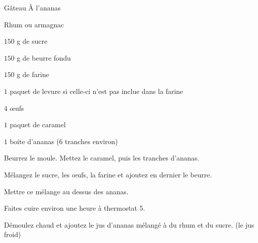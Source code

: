 \begin{recette}{Gâteau À l'ananas}
\begin{ingredients}
\item Rhum ou armagnac
\item $150$ g de sucre
\item $150$ g de beurre fondu
\item $150$ g de farine
\item $1$ paquet de levure si celle-ci n'est pas inclue dans la farine
\item $4$ œufs
\item $1$ paquet de caramel
\item $1$ boite d'ananas ($6$ tranches environ)
\end{ingredients}

\begin{preparation}
\item Beurrez le moule. Mettez le caramel, puis les tranches d'ananas.
\item Mélangez le sucre, les œufs, la farine et ajoutez en dernier le beurre.
\item Mettre ce mélange au dessus des ananas.
\end{preparation}

\begin{cuisson}
Faites cuire environ une heure à thermostat 5.

Démoulez chaud et ajoutez le jus d'ananas mélangé à du rhum et du sucre. (le jus froid)
\end{cuisson}

\end{recette}


